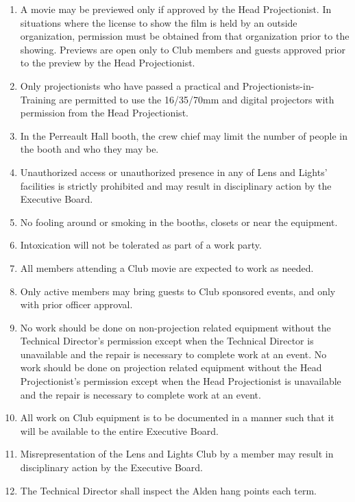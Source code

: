\documentclass[12pt,letterpaper,oneside]{book}
\begin{document}
\begin{enumerate}

\item A movie may be previewed only if approved by the Head Projectionist. In situations where the license to show the film is held by an outside organization, permission must be obtained from that organization prior to the showing. Previews are open only to Club members and guests approved prior to the preview by the Head Projectionist.
\item Only projectionists who have passed a practical and Projectionists-in-Training are permitted to use the 16/35/70mm and digital projectors with permission from the Head Projectionist.
\item In the Perreault Hall booth, the crew chief may limit the number of people in the booth and who they may be.
\item Unauthorized access or unauthorized presence in any of Lens and Lights' facilities is strictly prohibited and may result in disciplinary action by the Executive Board.
\item No fooling around or smoking in the booths, closets or near the equipment.
\item Intoxication will not be tolerated as part of a work party.
\item All members attending a Club movie are expected to work as needed.
\item Only active members may bring guests to Club sponsored events, and only with prior officer approval.
\item No work should be done on non-projection related equipment without the Technical Director's permission except when the Technical Director is unavailable and the repair is necessary to complete work at an event. No work should be done on projection related equipment without the Head Projectionist's permission except when the Head Projectionist is unavailable and the repair is necessary to complete work at an event.
\item All work on Club equipment is to be documented in a manner such that it will be available to the entire Executive Board.
\item Misrepresentation of the Lens and Lights Club by a member may result in disciplinary action by the Executive Board.
\item The Technical Director shall inspect the Alden hang points each term.

\end{enumerate}
\end{document}
